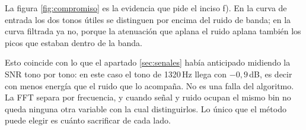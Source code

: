 La figura \ref{fig:compromiso} es la evidencia que pide el inciso f). En la curva
de entrada los dos tonos útiles se distinguen por encima del ruido de banda; en
la curva filtrada ya no, porque la atenuación que aplana el ruido aplana también
los picos que estaban dentro de la banda.

Esto coincide con lo que el apartado \ref{sec:senales} había anticipado midiendo
la SNR tono por tono: en este caso el tono de 1320\,Hz llega con $-0{,}9$\,dB, es
decir con menos energía que el ruido que lo acompaña. No es una falla del
algoritmo. La FFT separa por frecuencia, y cuando señal y ruido ocupan el mismo
bin no queda ninguna otra variable con la cual distinguirlos. Lo único que el
método puede elegir es cuánto sacrificar de cada lado.
